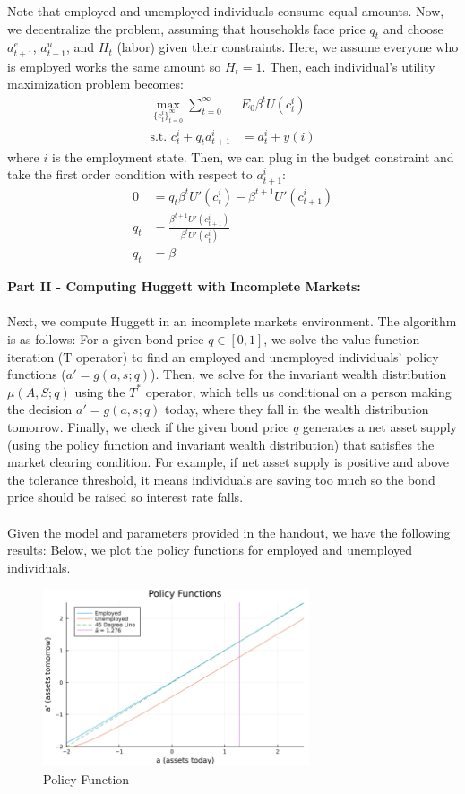 \documentclass[12pt]{article}
\begin{document}
Note that employed and unemployed individuals consume equal amounts. Now, we decentralize the problem, assuming that households face price $q_t$ and choose $a_{t+1}^e$, $a_{t+1}^u$, and $H_t$ (labor) given their constraints. Here, we assume everyone who is employed works the same amount so $H_t=1$. Then,  each individual's utility maximization problem becomes:
\begin{align*}
    \max_{\{c_t^i\}_{t=0}^{\infty}} \sum_{t=0}^{\infty} &E_0 \beta^t U(c^i_t) \\
    \text{s.t. } c^i_t + q_t a^i_{t+1} &= a^i_t + y(i)
\end{align*}
where $i$ is the employment state. Then, we can plug in the budget constraint and take the first order condition with respect to $a^i_{t+1}$:
\begin{align*}
    0 &= q_t \beta^t U'(c^i_t) - \beta^{t+1} U'(c^i_{t+1}) \\
    q_t &= \frac{\beta^{t+1} U'(c^i_{t+1})}{\beta^t U'(c^i_t)} \\
    q_t &= \beta 
\end{align*}

\pagebreak
\noindent \textbf{Part II - Computing Huggett with Incomplete Markets: } \\\\
Next, we compute Huggett in an incomplete markets environment. The algorithm is as follows: For a given bond price $q \in [0, 1]$, we solve the value function iteration (T operator) to find an employed and unemployed individuals' policy functions ($a' = g(a, s;q)$). Then, we solve for the invariant wealth distribution $\mu(A, S;q)$ using the $T^*$ operator, which tells us conditional on a person making the decision $a' = g(a, s;q)$ today, where they fall in the wealth distribution tomorrow. Finally, we check if the given bond price $q$ generates a net asset supply (using the policy function and invariant wealth distribution) that satisfies the market clearing condition. For example, if net asset supply is positive and above the tolerance threshold, it means individuals are saving too much so the bond price should be raised so interest rate falls. \\\\
Given the model and parameters provided in the handout, we have the following results: Below, we plot the policy functions for employed and unemployed individuals. 

\begin{figure}[!htbp]
    \centering
    \includegraphics[width = 0.7\textwidth]{Policy_Functions.png}
    \caption{Policy Function}
    \label{fig:pol}
\end{figure}
\end{document}
